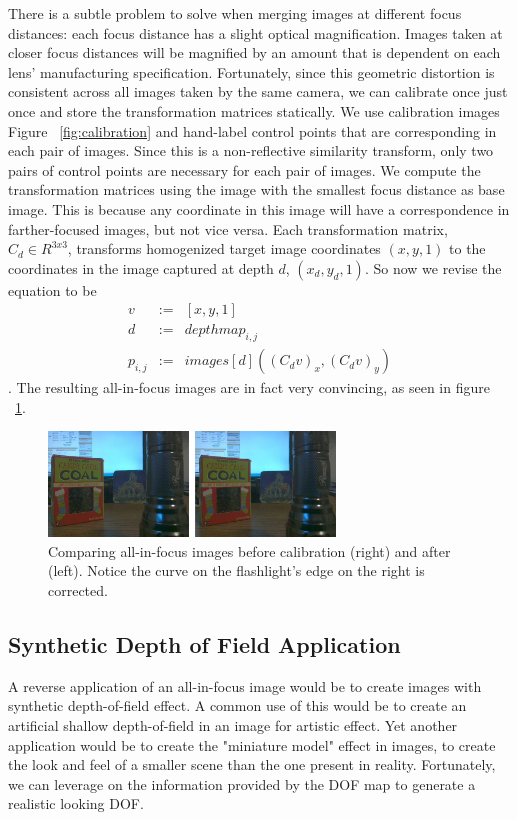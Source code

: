 \documentclass[annual, 12pt]{acmsiggraph}
\begin{document}
There is a subtle problem to solve when merging images at different focus distances: each focus distance has a slight optical magnification.  Images taken at closer focus distances will be magnified by an amount that is dependent on each lens' manufacturing specification.  Fortunately, since this geometric distortion is consistent across all images taken by the same camera, we can calibrate once just once and store the transformation matrices statically. We use calibration images Figure ~\ref{fig:calibration} and hand-label control points that are corresponding in each pair of images. Since this is a non-reflective similarity transform, only two pairs of control points are necessary for each pair of images.  We compute the transformation matrices using the image with the smallest focus distance as base image.  This is because any coordinate in this image will have a correspondence in farther-focused images, but not vice versa.  Each transformation matrix, $C_d\in R^{3x3}$, transforms homogenized target image coordinates $(x,y,1)$ to the coordinates in the image captured at depth $d$, $(x_d,y_d,1)$. So now we revise the equation to be
\begin{eqnarray} 
v &:=& [x,y,1] \nonumber \\
d &:=& depthmap_{i,j}  \nonumber \\
p_{i,j} &:=& images[ d ]( (C_d v)_x, (C_d v)_y)
\end{eqnarray}. The resulting all-in-focus images are in fact very convincing, as seen in figure ~\ref{fig:all-focus-calibrated}.

\begin{figure}
\centering
\includegraphics[width=3in]{images/all-focus-calibrated.jpg}
\caption{Comparing all-in-focus images before calibration (right) and after (left). Notice the curve on the flashlight's edge on the right is corrected.}
\label{fig:all-focus-calibrated}
\end{figure}


\subsection{Synthetic Depth of Field Application}

A reverse application of an all-in-focus image would be to create images with synthetic depth-of-field effect. A common use of this would be to create an artificial shallow depth-of-field in an image for artistic effect. Yet another application would be to create the "miniature model" effect in images, to create the look and feel of a smaller scene than the one present in reality. Fortunately, we can leverage on the information provided by the DOF map to generate a realistic looking DOF. 
\end{document}
